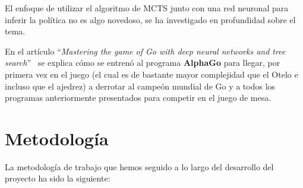 \documentclass[conference,a4paper]{IEEEtran}
\begin{document}
El enfoque de utilizar el algoritmo de MCTS junto con una red neuronal para inferir la política no es
algo novedoso, se ha investigado en profundidad sobre el tema.

En el artículo ``\textit{Mastering the game of Go with deep neural networks and tree search}''~\cite{b10}
se explica cómo se entrenó al programa \textbf{AlphaGo} para llegar, por primera vez en el juego (el cual es
de bastante mayor complejidad que el Otelo e incluso que el ajedrez) a derrotar al campeón mundial de Go
y a todos los programas anteriormente presentados para competir en el juego de mesa.

\section{Metodología}

La metodología de trabajo que hemos seguido a lo largo del desarrollo del proyecto ha sido la siguiente:
\end{document}
